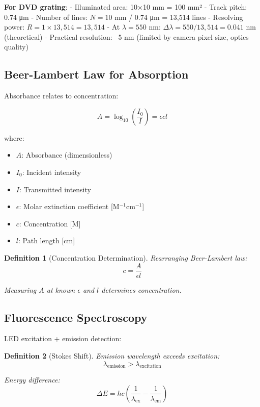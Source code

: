 \documentclass[12pt,a4paper]{article}
\newtheorem{definition}{Definition}
\begin{document}
\textbf{For DVD grating}:
- Illuminated area: 10×10 mm = 100 mm²
- Track pitch: 0.74 μm
- Number of lines: $N = 10$ mm / 0.74 μm = 13,514 lines
- Resolving power: $R = 1 \times 13,514 = 13,514$
- At $\lambda = 550$ nm: $\Delta\lambda = 550/13,514 = 0.041$ nm (theoretical)
- Practical resolution: ~5 nm (limited by camera pixel size, optics quality)

\subsection{Beer-Lambert Law for Absorption}

Absorbance relates to concentration:

\begin{equation}
A = \log_{10}\left(\frac{I_0}{I}\right) = \epsilon c l
\end{equation}

where:
\begin{itemize}
\item $A$: Absorbance (dimensionless)
\item $I_0$: Incident intensity
\item $I$: Transmitted intensity
\item $\epsilon$: Molar extinction coefficient [M$^{-1}$cm$^{-1}$]
\item $c$: Concentration [M]
\item $l$: Path length [cm]
\end{itemize}

\begin{definition}[Concentration Determination]
Rearranging Beer-Lambert law:
\begin{equation}
c = \frac{A}{\epsilon l}
\end{equation}

Measuring $A$ at known $\epsilon$ and $l$ determines concentration.
\end{definition}

\subsection{Fluorescence Spectroscopy}

LED excitation + emission detection:

\begin{definition}[Stokes Shift]
Emission wavelength exceeds excitation:
\begin{equation}
\lambda_{\text{emission}} > \lambda_{\text{excitation}}
\end{equation}

Energy difference:
\begin{equation}
\Delta E = hc\left(\frac{1}{\lambda_{\text{ex}}} - \frac{1}{\lambda_{\text{em}}}\right)
\end{equation}
\end{definition}
\end{document}
